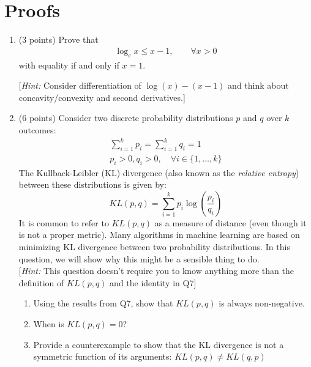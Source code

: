\section{Proofs}

\begin{enumerate}[resume]
\item (3 points) Prove that
%
\begin{align}
\log_e x\leq x-1, \qquad \forall x>0
\end{align}
%
with equality if and only if $x=1$.

[\emph{Hint:} Consider differentiation of $\log(x)-(x-1)$ and think about concavity/convexity and second derivatives.]
\pagebreak
\item (6 points)
Consider two discrete probability distributions $p$ and $q$ over $k$ outcomes:
%
\begin{subequations}
\begin{align}
\sum_{i=1}^k p_i = \sum_{i=1}^k q_i=1 \\
p_i > 0, q_i > 0, \quad \forall i \in \{1,\ldots,k\}
\end{align}
\end{subequations}
%
The Kullback-Leibler (KL) divergence (also known as the \emph{relative entropy}) between these distributions is given by:
%
\begin{equation}
KL(p,q)=\sum_{i=1}^{k} p_i\log\left(\frac{p_i}{q_i}\right)
\end{equation}
%
It is common to refer to $KL(p,q)$ as a measure of distance (even though it is not a proper metric).
Many algorithms in machine learning are based on minimizing KL divergence between two
probability distributions.
In this question, we will show why this might be a sensible thing to do.\\

[\emph{Hint:} This question doesn't require you to know anything more than the definition of $KL(p,q)$ and the identity
in Q$7$]

\begin{enumerate}
\item Using the results from Q$7$, show that $KL(p,q)$ is always non-negative.
\pagebreak
\item When is $KL(p,q) = 0$?
\pagebreak
\item Provide a counterexample to show that the KL divergence is not a symmetric function of its arguments: $KL(p,q) \neq KL(q,p)$
\end{enumerate}


\end{enumerate}
